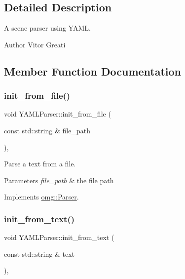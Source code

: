 \subsection{Detailed Description}
A scene parser using Y\+A\+ML. 

\begin{DoxyAuthor}{Author}
Vitor Greati 
\end{DoxyAuthor}


\subsection{Member Function Documentation}
\mbox{\label{classomg_1_1_y_a_m_l_parser_a88af0bc72d0f4ce3e9e489e0b6037a53}} 
\subsubsection{\texorpdfstring{init\_from\_file()}{init\_from\_file()}}
{\footnotesize\ttfamily void Y\+A\+M\+L\+Parser\+::init\+\_\+from\+\_\+file (\begin{DoxyParamCaption}\item[{const std\+::string \&}]{file\+\_\+path }\end{DoxyParamCaption})\hspace{0.3cm}{\ttfamily [override]}, {\ttfamily [virtual]}}



Parse a text from a file. 


\begin{DoxyParams}{Parameters}
{\em file\+\_\+path} & the file path \\
\hline
\end{DoxyParams}


Implements \mbox{\hyperlink{classomg_1_1_parser_aa0c44ed0f01edc2958667589d66ebe8a}{omg\+::\+Parser}}.

\mbox{\label{classomg_1_1_y_a_m_l_parser_a625f697e850b8d027095d74f7fe65acc}} 
\subsubsection{\texorpdfstring{init\_from\_text()}{init\_from\_text()}}
{\footnotesize\ttfamily void Y\+A\+M\+L\+Parser\+::init\+\_\+from\+\_\+text (\begin{DoxyParamCaption}\item[{const std\+::string \&}]{text }\end{DoxyParamCaption})\hspace{0.3cm}{\ttfamily [override]}, {\ttfamily [virtual]}}



